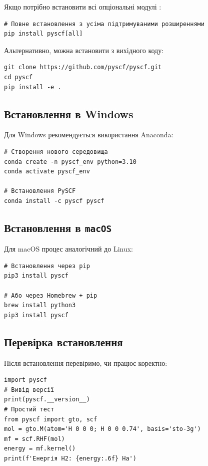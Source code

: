 Якщо потрібно встановити всі опціональні модулі \PySCF:

\begin{verbatim}
# Повне встановлення з усіма підтримуваними розширеннями
pip install pyscf[all]
\end{verbatim}

Альтернативно, можна встановити з вихідного коду:

\begin{verbatim}
git clone https://github.com/pyscf/pyscf.git
cd pyscf
pip install -e .
\end{verbatim}

\subsection{Встановлення в Windows}

Для Windows рекомендується використання Anaconda:

\begin{verbatim}
# Створення нового середовища
conda create -n pyscf_env python=3.10
conda activate pyscf_env

# Встановлення PySCF
conda install -c pyscf pyscf
\end{verbatim}

\subsection{Встановлення в \texttt{macOS}}

Для macOS процес аналогічний до Linux:

\begin{verbatim}
# Встановлення через pip
pip3 install pyscf

# Або через Homebrew + pip
brew install python3
pip3 install pyscf
\end{verbatim}

\subsection{Перевірка встановлення}

Після встановлення перевіримо, чи \PySCF{} працює коректно:
\begin{verbatim}
import pyscf
# Вивід версії
print(pyscf.__version__)
# Простий тест
from pyscf import gto, scf
mol = gto.M(atom='H 0 0 0; H 0 0 0.74', basis='sto-3g')
mf = scf.RHF(mol)
energy = mf.kernel()
print(f'Енергія H2: {energy:.6f} Ha')
\end{verbatim}

